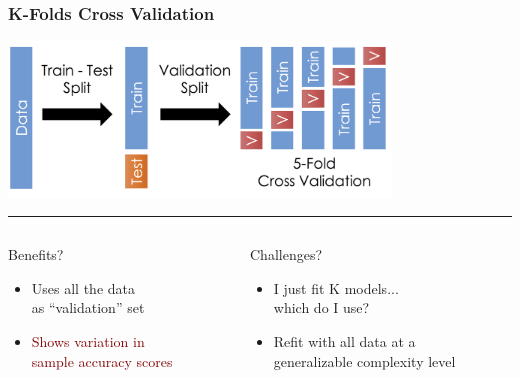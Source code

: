 \documentclass[xcolor={dvipsnames}]{beamer}
\begin{document}
\frame
{
\frametitle{K-Folds Cross Validation}

\includegraphics[width=4in]{stuff/train_test_split.png}

\vspace{-1.6in}

\par\noindent\rule{\textwidth}{0.4pt}

\vspace{.75em}

\begin{columns}
\begin{column}{.5\textwidth}

Benefits? 
\begin{itemize}
\item<2-> Uses all the data\\ as ``validation'' set
\item<3-> \textcolor{Maroon}{Shows variation in \\ sample accuracy scores} 
\end{itemize}

\end{column}


\begin{column}{.55\textwidth}

Challenges? 
\begin{itemize}
\item<4-> I just fit K models...\\which do I use?
\item<5-> Refit with all data at a \\  generalizable complexity level
\end{itemize}

\end{column}
\end{columns}


}
\end{document}
